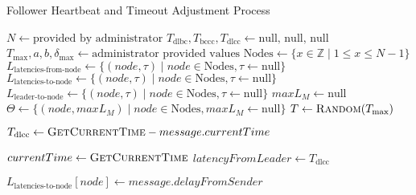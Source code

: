 \documentclass{article}
\begin{document}
    \begin{algorithm}
        \caption{Follower Heartbeat and Timeout Adjustment Process}
        \begin{algorithmic}[1]
            \State \( N \gets \text{provided by administrator} \) 
            \State \( T_{\mathrm{dlbc}}, T_{\mathrm{bccc}}, T_{\mathrm{dlcc}} \gets \text{null, null, null} \) 
            \State \( T_{\text{max}}, a, b, \delta_{\text{max}} \gets \text{administrator provided values} \) 
            \State \( \text{Nodes} \gets \{x \in \mathbb{Z} \mid 1 \leq x \leq N -1\} \) 
            \State \( L_{\text{latencies-from-node}} \gets \{(node, \tau) \mid node \in \text{Nodes}, \tau \gets \text{null}\} \) 
            \State \( L_{\text{latencies-to-node}} \gets \{(node, \tau) \mid node \in \text{Nodes}, \tau \gets \text{null}\} \) 
            \State \( L_{\text{leader-to-node}} \gets \{(node, \tau) \mid node \in \text{Nodes}, \tau \gets \text{null}\} \) 
            \State \( maxL_M \gets \text{null} \) 
            \State \( \Theta \gets \{(node, maxL_M) \mid node \in \text{Nodes}, maxL_M \gets \text{null}\} \) 
            \State \( T \gets \Call{Random}{T_{\max}} \) 

                \State \( T_{\mathrm{dlcc}} \gets \Call{GetCurrentTime}{} - message.currentTime \)
            \EndProcedure

                \State \( currentTime \gets \Call{GetCurrentTime}{} \)
                \State \( latencyFromLeader \gets T_{\mathrm{dlcc}} \)
                    \State {}
                \EndFor
            \EndProcedure

                \State \( L_{\text{latencies-to-node}}[node] \gets message.delayFromSender \)
            \EndProcedure


\end{algorithmic}
\end{algorithm}
\end{document}
